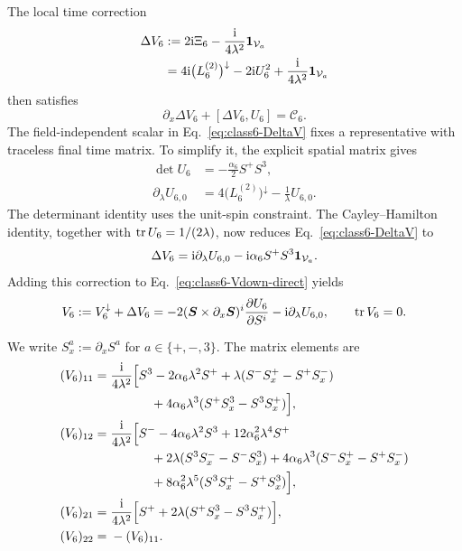 The local time correction
\begin{align}
\Delta V_6
&:=2\mathrm{i}\Xi_6-\frac{\mathrm{i}}{4\lambda^2}\mathbf{1}_{\mathcal V_a}
\nonumber\\
&=4\mathrm{i}\bigl(L_6^{(2)}\bigr)^\downarrow
-2\mathrm{i} U_6^2+\frac{\mathrm{i}}{4\lambda^2}\mathbf{1}_{\mathcal V_a}
\label{eq:class6-DeltaV}
\end{align}
then satisfies
\begin{equation}
\partial_x\Delta V_6+[\Delta V_6,U_6]=\mathcal C_6.
\label{eq:class6-DeltaV-absorbs-C}
\end{equation}
The field-independent scalar in Eq.~\eqref{eq:class6-DeltaV} fixes a
representative with traceless final time matrix.  To simplify it, the
explicit spatial matrix gives
\begin{align}
\det U_6&=-\frac{\alpha_6}{2}S^+S^3,
\nonumber\\
\partial_\lambda U_{6,0}
&=4\bigl(L_6^{(2)}\bigr)^\downarrow-\frac{1}{\lambda}U_{6,0}.
\label{eq:class6-spatial-spectral-identities}
\end{align}
The determinant identity uses the unit-spin constraint.  The
Cayley--Hamilton identity, together with $\operatorname{tr} U_6=1/(2\lambda)$, now
reduces Eq.~\eqref{eq:class6-DeltaV} to
\begin{equation}
\Delta V_6
=\mathrm{i}\partial_\lambda U_{6,0}
-\mathrm{i}\alpha_6S^+S^3\mathbf{1}_{\mathcal V_a}.
\label{eq:class6-DeltaV-spectral}
\end{equation}
Adding this correction to Eq.~\eqref{eq:class6-Vdown-direct} yields
\begin{equation}
V_6:=V_6^\downarrow+\Delta V_6
=-2(\boldsymbol S\times\partial_x\boldsymbol S)^i
\frac{\partial U_6}{\partial S^i}
-\mathrm{i}\partial_\lambda U_{6,0},
\qquad \operatorname{tr} V_6=0.
\label{eq:class6-time-Lax-compact}
\end{equation}

We write $S_x^a:=\partial_x S^a$ for $a\in\{+,-,3\}$.  The matrix elements are
\begin{align}
(V_6)_{11}
={}&\frac{\mathrm{i}}{4\lambda^2}\Bigl[
S^3-2\alpha_6\lambda^2S^+
+\lambda(S^-S_x^+-S^+S_x^-)
\nonumber\\
&\hspace{3.2em}
+4\alpha_6\lambda^3(S^+S_x^3-S^3S_x^+)
\Bigr],
\label{eq:class6-time-Lax-11}\\
(V_6)_{12}
={}&\frac{\mathrm{i}}{4\lambda^2}\Bigl[
S^--4\alpha_6\lambda^2S^3+12\alpha_6^2\lambda^4S^+
\nonumber\\
&\hspace{3.2em}
+2\lambda(S^3S_x^--S^-S_x^3)
+4\alpha_6\lambda^3(S^-S_x^+-S^+S_x^-)
\nonumber\\
&\hspace{3.2em}
+8\alpha_6^2\lambda^5(S^3S_x^+-S^+S_x^3)
\Bigr],
\label{eq:class6-time-Lax-12}\\
(V_6)_{21}
={}&\frac{\mathrm{i}}{4\lambda^2}\Bigl[
S^++2\lambda(S^+S_x^3-S^3S_x^+)
\Bigr],
\label{eq:class6-time-Lax-21}\\
(V_6)_{22}
={}&-(V_6)_{11}.
\label{eq:class6-time-Lax-22}
\end{align}

